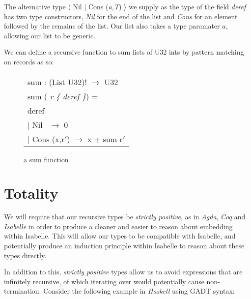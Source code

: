 The alternative type {$\langle$ Nil $\vert$ Cons (\textit{a,T}) $\rangle$} we supply as the type of the field
\textit{deref} has two type constructors, \textit{Nil} for the end of the list and \textit{Cons} for an element
followed by the remains of the list. Our list also takes a type paramater $a$, allowing our list to be generic.

We can define a recursive function to sum lists of U32 ints by pattern matching on records as so:

\begin{figure}
    \begin{center}
        \begin{tabular}{l}
            sum : (List U32)! $\rightarrow$ U32 \\
            sum (\textit{ r \{ deref \}}) = \\
            \hspace{0.8em} deref \\
                \hspace{2em} $\vert$ Nil  \quad\quad\quad$\,$   $\rightarrow$ 0 \\
                \hspace{2em} $\vert$ Cons (x,r$'$)  $\rightarrow$ x + sum r$'$
        \end{tabular}
    \end{center}
    \caption[short]{a sum function}
    \label{fig:sum}
\end{figure}



\section{Totality}

We will require that our recursive types be \textit{strictly positive}, as in \textit{Agda},
\textit{Coq} and \textit{Isabelle} in order to produce a cleaner and easier to reason about
embedding within Isabelle. This will allow our types to be compatible with Isabelle, and potentially
produce an induction principle within Isabelle to reason about these types directly.

In addition to this, \textit{strictly positive} types allow us to avoid expressions that are infinitely recursive,
of which iterating over would potentially cause non-termination. Consider
the following example in \textit{Haskell} using GADT syntax:

\pagebreak



